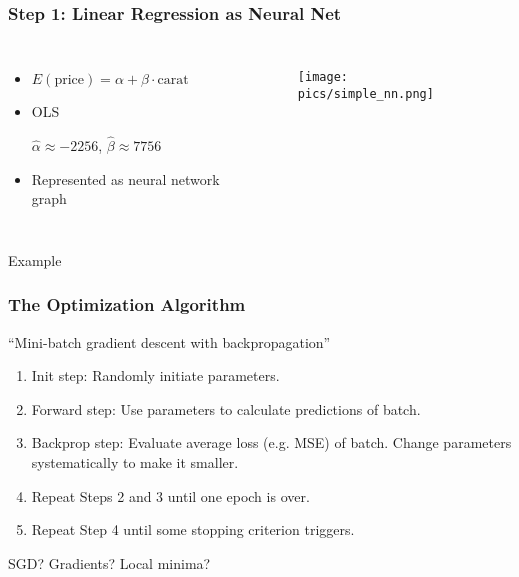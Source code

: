 \documentclass[
    utf8,
    aspectratio=169
]{beamer}  %
\begin{document}
\begin{frame}
	\frametitle{Step 1: Linear Regression as Neural Net}
	\begin{columns}
		\begin{itemize}
			\item $E(\text{price})=\alpha+\beta \cdot \text{carat}$
			\item OLS 
			
			$\hat\alpha \approx -2256$, $\hat\beta \approx 7756$
			\item Represented as neural network graph
		\end{itemize}
		\begin{figure}
		\texttt{[image: pics/simple\_nn.png]}
	\end{figure}
	\end{columns}
	
	\vfill

	\begin{exampleblock}{\centering Example}
	\end{exampleblock}
\end{frame}

\begin{frame}
	\frametitle{The Optimization Algorithm}
	\begin{block}{``Mini-batch gradient descent with \alert{backpropagation}''}
		\begin{enumerate}
			\item Init step: Randomly initiate parameters.
			\item Forward step: Use parameters to calculate predictions of \alert{batch}.
			\item Backprop step: Evaluate \alert{average loss} (e.g. MSE) of batch. Change parameters systematically to make it smaller.
			\item Repeat Steps 2 and 3 until one \alert{epoch} is over.
			\item Repeat Step 4 until some stopping criterion triggers.
		\end{enumerate}
	\end{block}

	\vfill

	SGD? Gradients? Local minima?
\end{frame}
\end{document}
